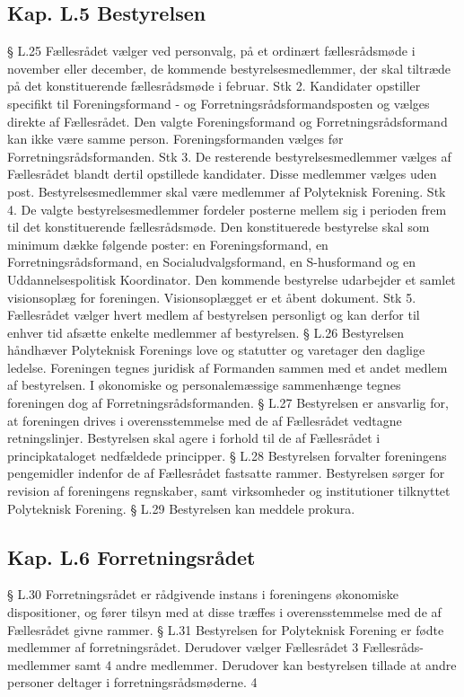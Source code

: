 \begin{list}
\subsection{Kap. L.5 Bestyrelsen}
\label{kap:bestyrelsen}
§ L.25
Fællesrådet vælger ved personvalg, på et ordinært fællesrådsmøde i november eller december, de kommende
bestyrelsesmedlemmer, der skal tiltræde på det konstituerende fællesrådsmøde i februar.
Stk 2. Kandidater opstiller specifikt til Foreningsformand - og Forretningsrådsformandsposten og vælges
direkte af Fællesrådet. Den valgte Foreningsformand og Forretningsrådsformand kan ikke være samme
person. Foreningsformanden vælges før Forretningsrådsformanden.
Stk 3. De resterende bestyrelsesmedlemmer vælges af Fællesrådet blandt dertil opstillede kandidater. Disse
medlemmer vælges uden post. Bestyrelsesmedlemmer skal være medlemmer af Polyteknisk Forening.
Stk 4. De valgte bestyrelsesmedlemmer fordeler posterne mellem sig i perioden frem til det konstituerende
fællesrådsmøde. Den konstituerede bestyrelse skal som minimum dække følgende poster: en
Foreningsformand, en Forretningsrådsformand, en Socialudvalgsformand, en S-husformand og en
Uddannelsespolitisk Koordinator. Den kommende bestyrelse udarbejder et samlet visionsoplæg for
foreningen. Visionsoplægget er et åbent dokument.
Stk 5. Fællesrådet vælger hvert medlem af bestyrelsen personligt og kan derfor til enhver tid afsætte enkelte
medlemmer af bestyrelsen.
§ L.26 Bestyrelsen håndhæver Polyteknisk Forenings love og statutter og varetager den daglige ledelse. Foreningen
         tegnes juridisk af Formanden sammen med et andet medlem af bestyrelsen. I økonomiske og
         personalemæssige sammenhænge tegnes foreningen dog af Forretningsrådsformanden.
§ L.27 Bestyrelsen er ansvarlig for, at foreningen drives i overensstemmelse med de af Fællesrådet vedtagne
         retningslinjer. Bestyrelsen skal agere i forhold til de af Fællesrådet i principkataloget nedfældede principper.
§ L.28 Bestyrelsen forvalter foreningens pengemidler indenfor de af Fællesrådet fastsatte rammer. Bestyrelsen
         sørger for revision af foreningens regnskaber, samt virksomheder og institutioner tilknyttet Polyteknisk
         Forening.
§ L.29 Bestyrelsen kan meddele prokura.
\subsection{Kap. L.6 Forretningsrådet}
§ L.30 Forretningsrådet er rådgivende instans i foreningens økonomiske dispositioner, og fører tilsyn med at disse
           træffes i overensstemmelse med de af Fællesrådet givne rammer.
§ L.31 Bestyrelsen for Polyteknisk Forening er fødte medlemmer af forretningsrådet. Derudover vælger Fællesrådet
            3 Fællesråds-medlemmer samt 4 andre medlemmer. Derudover kan bestyrelsen tillade at andre personer
             deltager i forretningsrådsmøderne.
4

\end{list}
